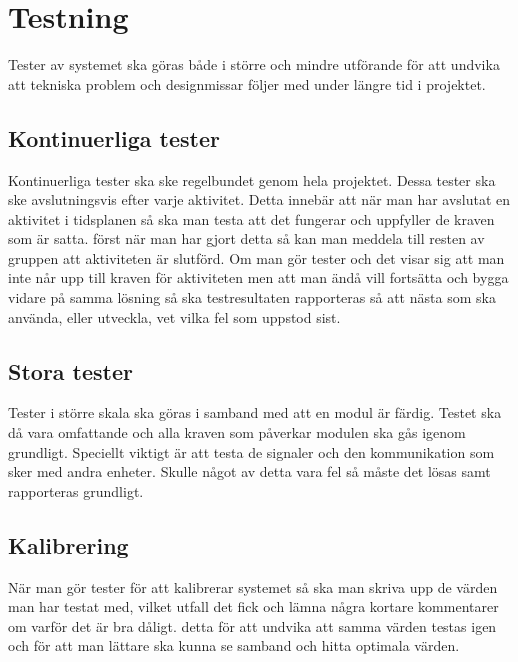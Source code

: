 \section{Testning}
Tester av systemet ska göras både i större och mindre utförande för att undvika att tekniska problem och designmissar följer med under längre tid i projektet.

\subsection{Kontinuerliga tester}
Kontinuerliga tester ska ske regelbundet genom hela projektet. Dessa tester ska ske avslutningsvis efter varje aktivitet. Detta innebär att när man har avslutat en aktivitet i tidsplanen så ska man testa att det fungerar och uppfyller de kraven som är satta. först när man har gjort detta så kan man meddela till resten av gruppen att aktiviteten är slutförd. Om man gör tester och det visar sig att man inte når upp till kraven för aktiviteten men att man ändå vill fortsätta och bygga vidare på samma lösning så ska testresultaten rapporteras så att nästa som ska använda, eller utveckla, vet vilka fel som uppstod sist.

\subsection{Stora tester}
Tester i större skala ska göras i samband med att en modul är färdig. Testet ska då vara omfattande och alla kraven som påverkar modulen ska gås igenom grundligt. Speciellt viktigt är att testa de signaler och den kommunikation som sker med andra enheter. Skulle något av detta vara fel så måste det lösas samt rapporteras grundligt.

\subsection{Kalibrering}
När man gör tester för att kalibrerar systemet så ska man skriva upp de värden man har testat med, vilket utfall det fick och lämna några kortare kommentarer om varför det är bra dåligt. detta för att undvika att samma värden testas igen och för att man lättare ska kunna se samband och hitta optimala värden.